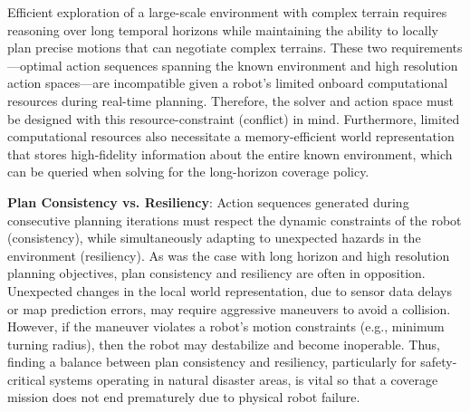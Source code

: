 \documentclass[letterpaper]{article} %
\newcommand{\ph}[1]{{\textbf{#1}:}} %
\begin{document}
    
    
    



    



Efficient exploration of a large-scale environment with complex terrain requires reasoning over long temporal horizons while maintaining the ability to locally plan precise motions that can negotiate complex terrains. These two requirements---optimal action sequences spanning the known environment and high resolution action spaces---are incompatible given a robot's limited onboard computational resources during real-time planning. Therefore, the solver and action space must be designed with this resource-constraint (conflict) in mind. Furthermore, limited computational resources also necessitate a memory-efficient world representation that stores high-fidelity information about the entire known environment, which can be queried when solving for the long-horizon coverage policy. 
 
\ph{Plan Consistency vs. Resiliency}
Action sequences generated during consecutive planning iterations must respect the dynamic constraints of the robot (consistency), while simultaneously adapting to unexpected hazards in the environment (resiliency). As was the case with long horizon and high resolution planning objectives, plan consistency and resiliency are often in opposition. Unexpected changes in the local world representation, due to sensor data delays or map prediction errors, may require aggressive maneuvers to avoid a collision. However, if the maneuver violates a robot's motion constraints (e.g., minimum turning radius), then the robot may destabilize and become inoperable. Thus, finding a balance between plan consistency and resiliency, particularly for safety-critical systems operating in natural disaster areas, is vital so that a coverage mission does not end prematurely due to physical robot failure. 
\end{document}
